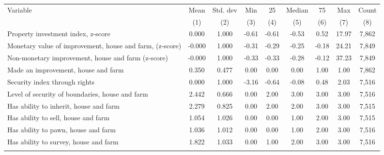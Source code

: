 \begin{tabular}{lcccccccc}
\hline \noalign{\smallskip}Variable & Mean & Std. dev & Min & 25 & Median & 75 & Max & Count\\
 & (1) & (2) & (3) & (4) & (5) & (6) & (7) & (8)\\
\noalign{\smallskip}\hline \noalign{\smallskip}Property investment index, z-score & 0.000 & 1.000 & -0.61 & -0.61 & -0.53 & 0.52 & 17.97 & 7,862\\
\quad Monetary value of improvement, house and farm, (z-score) & -0.000 & 1.000 & -0.31 & -0.29 & -0.25 & -0.18 & 24.21 & 7,849\\
\quad Non-monetary improvement, house and farm (z-score) & -0.000 & 1.000 & -0.33 & -0.33 & -0.28 & -0.12 & 37.23 & 7,849\\
\quad Made an improvement, house and farm & 0.350 & 0.477 & 0.00 & 0.00 & 0.00 & 1.00 & 1.00 & 7,862\\
Security index through rights & 0.000 & 1.000 & -3.16 & -0.64 & -0.08 & 0.48 & 2.03 & 7,516\\
\quad Level of security of boundaries, house and farm & 2.442 & 0.666 & 0.00 & 2.00 & 3.00 & 3.00 & 3.00 & 7,516\\
\quad Has ability to inherit, house and farm & 2.279 & 0.825 & 0.00 & 2.00 & 2.00 & 3.00 & 3.00 & 7,515\\
\quad Has ability to sell, house and farm & 1.054 & 1.026 & 0.00 & 0.00 & 1.00 & 2.00 & 3.00 & 7,515\\
\quad Has ability to pawn, house and farm & 1.036 & 1.012 & 0.00 & 0.00 & 1.00 & 2.00 & 3.00 & 7,516\\
\quad Has ability to survey, house and farm & 1.822 & 1.033 & 0.00 & 1.00 & 2.00 & 3.00 & 3.00 & 7,516\\
\noalign{\smallskip}\hline\end{tabular}
